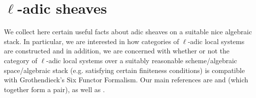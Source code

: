 \section{\texorpdfstring{$\ell$}{}-adic sheaves}
    We collect here certain useful facts about adic sheaves on a suitable nice algebraic stack. In particular, we are interested in how categories of $\ell$-adic local systems are constructed and in addition, we are concerned with whether or not the category of $\ell$-adic local systems over a suitably reasonable scheme/algebraic space/algebraic stack (e.g. satisfying certain finiteness conditions) is compatible with Grothendieck's Six Functor Formalism. Our main references are \cite{freitag_kiehl_etale_cohomology} and \cite{kiehl_weissauer_weil_conjecture_perverse_sheaves_and_l_adic_fourier_transform} (which together form a pair), as well as \cite{laszlo_olsson_adic_sheaves_on_artin_stacks_1}.
    

